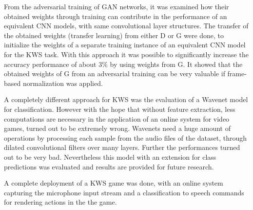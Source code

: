 From the adversarial training of GAN networks, it was examined how their obtained weights through training can contribute in the performance of an equivalent CNN models, with same convolutional layer structures.
The transfer of the obtained weights (transfer learning) from either D or G were done, to initialize the weights of a separate training instance of an equivalent CNN model for the KWS task.
With this approach it was possible to significantly increase the accuracy performance of about $3\%$ by using weights from G.
It showed that the obtained weights of G from an adversarial training can be very valuable if frame-based normalization was applied.

A completely different approach for KWS was the evaluation of a Wavenet \cite{Oord2016} model for classification.
However with the hope that without feature extraction, less computations are necessary in the application of an online system for video games, turned out to be extremely wrong.
Wavenets need a huge amount of operations by processing each sample from the audio files of the dataset, through dilated convolutional filters over many layers.
Further the performances turned out to be very bad.
Nevertheless this model with an extension for class predictions was evaluated and results are provided for future research.

A complete deployment of a KWS game was done, with an online system capturing the microphone input stream and a classification to speech commands for rendering actions in the the game.